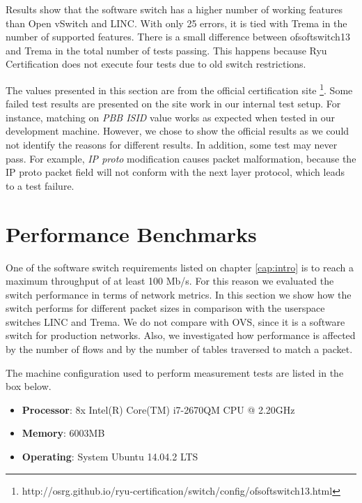 Results show that the software switch has a higher number of working features than Open vSwitch and LINC. With only 25 errors, it is tied with Trema in the number of supported features. There is a small difference between ofsoftswitch13 and Trema in the total number of tests passing. This happens because Ryu Certification does not execute four tests due to old switch restrictions.

The values presented in this section are from the official certification site \footnote{http://osrg.github.io/ryu-certification/switch/config/ofsoftswitch13.html}. Some failed test results are presented on the site work in our internal test setup. For instance, matching on \textit{PBB ISID} value works as expected when tested in our development machine. However, we chose to show the official results as we could not identify the reasons for different results. In addition, some test may never pass. For example, \textit{IP proto} modification causes packet malformation, because the IP proto packet field will not conform with the next layer protocol, which leads to a test failure. 

\section{Performance Benchmarks}

One of the software switch requirements listed on chapter \ref{cap:intro} is to reach a maximum throughput of at least 100 Mb/s. For this reason we evaluated the switch performance in terms of network metrics. In this section we show how the switch performs for different packet sizes in comparison with the userspace switches LINC and Trema. We do not compare with OVS, since it is a software switch for production networks. Also, we investigated how performance is affected by the number of flows and by the number of tables traversed to match a packet.  

The machine configuration used to perform measurement tests are listed in the box below. 

\begin{framed}

\begin{itemize}
\item \textbf{Processor}:	8x Intel(R) Core(TM) i7-2670QM CPU @ 2.20GHz
\item \textbf{Memory}:	6003MB 
\item \textbf{Operating}: System	Ubuntu 14.04.2 LTS
\end{itemize}

\end{framed}

